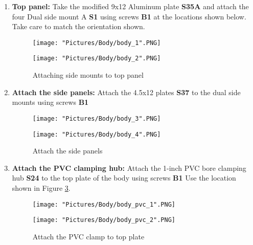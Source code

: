 \documentclass{article}
\begin{document}
\begin{enumerate}
\item \textbf{Top panel: } Take the modified 9x12 Aluminum plate \textbf{S35A} and attach the four Dual side mount A \textbf{S1} using screws \textbf{B1} at the locations shown below. Take care to match the orientation shown. 

\begin{figure}[H]
  	\centering
  	\begin{minipage}[b]{0.45\textwidth}
    		\texttt{[image: "Pictures/Body/body\_1".PNG]}
  	\end{minipage}
  	\hfill
  	\begin{minipage}[b]{0.45\textwidth}
    		\texttt{[image: "Pictures/Body/body\_2".PNG]}
  	\end{minipage}
  	\caption{Attaching side mounts to top panel}
	\label{top_plate}
\end{figure}

\item \textbf{Attach the side panels: } Attach the 4.5x12 plates \textbf{S37} to the dual side mounts using screws \textbf{B1} 

\begin{figure}[H]
 	\centering
 	\begin{minipage}[b]{0.45\textwidth}
    		\texttt{[image: "Pictures/Body/body\_3".PNG]}
  	\end{minipage}
  	\hfill
  	\begin{minipage}[b]{0.45\textwidth}
    		\texttt{[image: "Pictures/Body/body\_4".PNG]}
  	\end{minipage}
  	\caption{Attach the side panels}
	\label{Body side panels}
\end{figure}

\item \textbf{Attach the PVC clamping hub:} Attach the 1-inch PVC bore clamping hub \textbf{S24} to the top plate of the body using screws \textbf{B1} Use the location shown in Figure \ref{pvc to top plate}.

\begin{figure}[H]
  \centering
  \begin{minipage}[b]{0.40\textwidth}
    \texttt{[image: "Pictures/Body/body\_pvc\_1".PNG]}
  \end{minipage}
  \hfill
  \begin{minipage}[b]{0.50\textwidth}
    \texttt{[image: "Pictures/Body/body\_pvc\_2".PNG]}
  \end{minipage}
  \caption{Attach the PVC clamp to top plate}
	\label{pvc to top plate}
\end{figure}

\end{enumerate}
\end{document}
